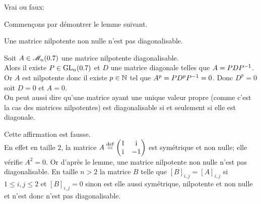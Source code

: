 \begin{exercice}
    Vrai ou faux: 
\end{exercice}

Commençons par démontrer le lemme suivant.

\begin{lemme} 
    Une matrice nilpotente non nulle n'est pas diagonalisable.
\end{lemme}
    
\begin{preuve}
    Soit $A \in \mathscr{M}_n(0.7)$ une matrice nilpotente diagonalisable. \\
    Alors il existe $P \in \mathrm{GL}_n(0.7)$ et $D$ une matrice diagonale telles que $A = PDP^{-1}$. Or $A$ est nilpotente donc il existe $p \in \mathbb{N}$ tel que $A^p = P D^p P^{-1} = 0$. Donc $D^p = 0$ soit $D = 0$ et $A = 0$. \\
    On peut aussi dire qu'une matrice ayant une unique valeur propre (comme c'est la cas des matrices nilpotentes) est diagonalisable si et seulement si elle est diagonale.
\end{preuve}

\begin{solution}
    Cette affirmation est fausse. \\
    En effet en taille $2$, la matrice $A \overset{\mathrm{\tiny def}}{=} \begin{pmatrix}
        1 & \mathrm{i} \\
        \mathrm{i} & -1
    \end{pmatrix}$ est symétrique et non nulle; elle vérifie $A^2 = 0$. Or d'après le lemme, une matrice nilpotente non nulle n'est pas diagonalisable. En taille $n > 2$ la matrice $B$ telle que $[B]_{i,j} = [A]_{i,j}$ si $1 \leqslant i, j \leqslant 2$ et $[B]_{i,j} = 0$ sinon est elle aussi symétrique, nilpotente et non nulle et n'est donc n'est pas diagonalisable. 
\end{solution}   

